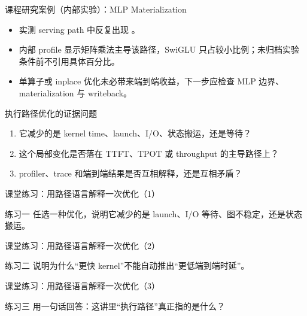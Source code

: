 \begin{frame}{课程研究案例（内部实验）：MLP Materialization}
  \begin{itemize}
    \item 实测 serving path 中反复出现 \texttt{}。
    \item 内部 profile 显示矩阵乘法主导该路径，SwiGLU 只占较小比例；未归档实验条件前不引用具体百分比。
    \item 单算子或 inplace 优化未必带来端到端收益，下一步应检查 MLP 边界、materialization 与 writeback。
  \end{itemize}
  \InternalCaseNote
\end{frame}

\begin{frame}{执行路径优化的证据问题}
  \begin{enumerate}
    \item 它减少的是 kernel time、launch、I/O、状态搬运，还是等待？
    \item 这个局部变化是否落在 TTFT、TPOT 或 throughput 的主导路径上？
    \item profiler、trace 和端到端结果是否互相解释，还是互相矛盾？
  \end{enumerate}
\end{frame}

\begin{frame}{课堂练习：用路径语言解释一次优化（1）}
\begin{block}{练习一}
    任选一种优化，说明它减少的是 launch、I/O 等待、图不稳定，还是状态搬运。
  \end{block}
\end{frame}

\begin{frame}{课堂练习：用路径语言解释一次优化（2）}
\begin{block}{练习二}
    说明为什么“更快 kernel”不能自动推出“更低端到端时延”。
  \end{block}
\end{frame}

\begin{frame}{课堂练习：用路径语言解释一次优化（3）}
\begin{block}{练习三}
    用一句话回答：这讲里“执行路径”真正指的是什么？
  \end{block}
\end{frame}
